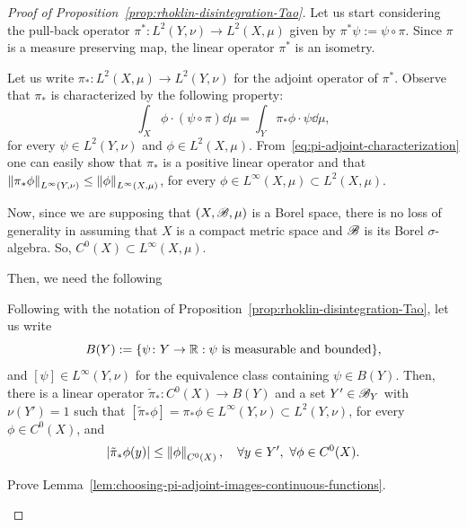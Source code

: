 \begin{proof}[Proof of Proposition~\ref{prop:rhoklin-disintegration-Tao}]
  Let us start considering the pull-back operator $\pi^*\colon L^2(Y,\nu)\to L^2(X,\mu)$ given by $\pi^*\psi:=\psi\circ\pi$. Since $\pi$ is a measure preserving map, the linear operator $\pi^*$ is an isometry.

  Let us write $\pi_*\colon L^2(X,\mu)\to L^2(Y,\nu)$ for the adjoint operator of $\pi^*$. Observe that $\pi_*$ is characterized by the following property:
  \begin{equation}
    \label{eq:pi-adjoint-characterization}
    \int_X \phi\cdot (\psi\circ\pi)\dd\mu = \int_Y \pi_*\phi\cdot \psi\dd\mu,
  \end{equation}
  for every $\psi\in L^2(Y,\nu)$ and $\phi\in L^2(X,\mu)$. From~\eqref{eq:pi-adjoint-characterization} one can easily show that $\pi_*$ is a positive linear operator and that $\left\|{\pi_*\phi}\right\|_{L^\infty(Y,\nu)}\leq \left\|{\phi}\right\|_{L^\infty(X,\mu)}$, for every $\phi\in L^\infty(X,\mu)\subset L^2(X,\mu)$.

  Now, since we are supposing that $(X,\mathscr{B},\mu)$ is a Borel space, there is no loss of generality in assuming that $X$ is a compact metric space and $\mathscr{B}$ is its Borel $\sigma$-algebra. So, $C^0(X)\subset L^\infty(X,\mu)$.

  Then, we need the following
  \begin{lemma} \label{lem:choosing-pi-adjoint-images-continuous-functions}
    Following with the notation of Proposition~\ref{prop:rhoklin-disintegration-Tao}, let us write
    \begin{displaymath}
      B(Y):=\{\psi\colon Y\to\mathbb{R} : \psi\text{ is measurable and bounded}\},
    \end{displaymath}
    and $[\psi]\in L^\infty(Y,\nu)$ for the equivalence class containing $\psi\in B(Y)$. Then, there is a linear operator $\tilde \pi_*\colon C^0(X)\to B(Y)$ and a set $Y'\in\mathscr{B}_Y$ with $\nu(Y')=1$ such that $[\tilde \pi_*\phi]=\pi_*\phi\in L^\infty(Y,\nu)\subset L^2(Y,\nu)$, for every $\phi\in C^0(X)$, and
    \begin{displaymath}
      \left\lvert{\tilde \pi_*\phi(y)}\right\rvert\leq \left\|{\phi}\right\|_{C^0(X)},\quad\forall y\in Y',\ \forall \phi\in C^0(X).
    \end{displaymath}
  \end{lemma}

  \begin{exercise}
    Prove Lemma~\ref{lem:choosing-pi-adjoint-images-continuous-functions}.
  \end{exercise}


\end{proof}
